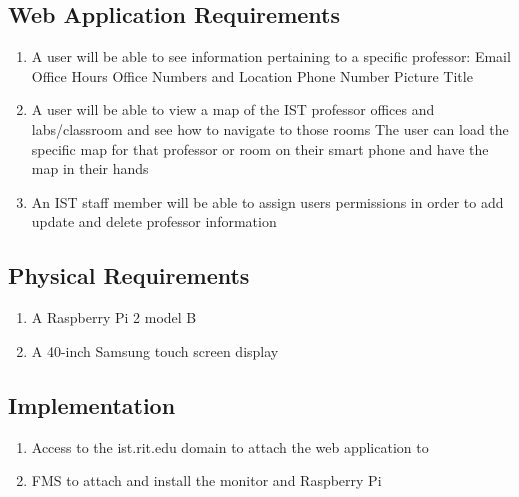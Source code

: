 \subsection{Web Application Requirements}
	\begin{enumerate}
		\item A user will be able to see information pertaining to a specific professor:
			\subitem Email
			\subitem Office Hours
			\subitem Office Numbers and Location
			\subitem Phone Number
			\subitem Picture
			\subitem Title
		\item A user will be able to view a map of the IST professor offices and labs/classroom and see how to navigate to those rooms
			\subitem The user can load the specific map for that professor or room on their smart phone and have the map in their hands
		\item An IST staff member will be able to assign users permissions in order to add update and delete professor information
	\end{enumerate}
	
\subsection{Physical Requirements}
	\begin{enumerate}
		\item A Raspberry Pi 2 model B
		\item A 40-inch Samsung touch screen display
	\end{enumerate}

\subsection{Implementation}
	\begin{enumerate}
		\item Access to the ist.rit.edu domain to attach the web application to
		\item FMS to attach and install the monitor and Raspberry Pi
	\end{enumerate}
	
